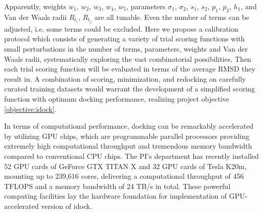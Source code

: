 \documentclass[a4paper,12pt]{article}
\begin{document}
Apparently, weights $w_1$, $w_2$, $w_3$, $w_4$, $w_5$, parameters $\sigma_1$, $\sigma_2$, $s_1$, $s_2$, $p_1$, $p_2$, $h_1$, and Van der Waals radii $R_{t_i}$, $R_{t_j}$ are all tunable. Even the number of terms can be adjusted, i.e. some terms could be excluded. Here we propose a calibration protocol which consists of generating a variety of trial scoring functions with small perturbations in the number of terms, parameters, weights and Van der Waals radii, systematically exploring the vast combinatorial possibilities. Then each trial scoring function will be evaluated in terms of the average RMSD they result in. A combination of scoring, minimization, and redocking on carefully curated training datasets would warrant the development of a simplified scoring function with optimum docking performance, realizing project objective \ref{objective:idock}.

In terms of computational performance, docking can be remarkably accelerated by utilizing GPU chips, which are programmable parallel processors providing extremely high computational throughput and tremendous memory bandwidth compared to conventional CPU chips. The PI's department has recently installed 52 GPU cards of GeForce GTX TITAN X and 32 GPU cards of Tesla K20m, mounting up to 239,616 cores, delivering a computational throughput of 456 TFLOPS and a memory bandwidth of 24 TB/s in total. These powerful computing facilities lay the hardware foundation for implementation of GPU-accelerated version of idock.


\end{document}
